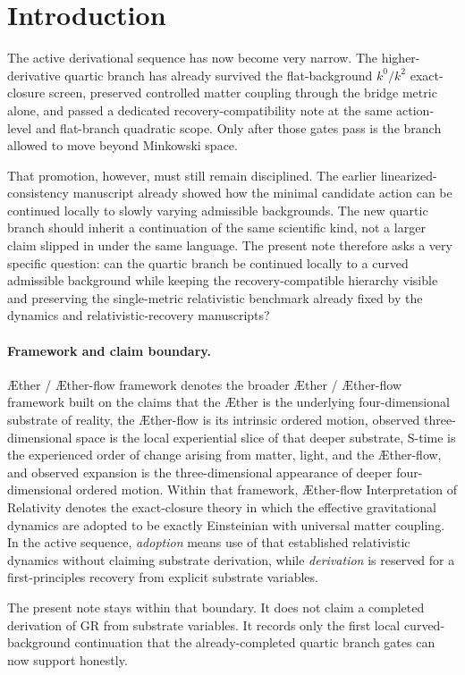 \documentclass[11pt]{article}
\newcommand{\Aether}{\AE{}ther}
\newcommand{\Aflow}{\AE{}ther-flow}
\newcommand{\TheoryName}{\Aflow{} Interpretation of Relativity}
\newcommand{\TheoryProgram}{\Aether{} / \Aflow{} framework}
\begin{document}
\section{Introduction}

The active derivational sequence has now become very narrow. The higher-derivative quartic branch has already survived the flat-background \(k^0/k^2\) exact-closure screen, preserved controlled matter coupling through the bridge metric alone, and passed a dedicated recovery-compatibility note at the same action-level and flat-branch quadratic scope. Only after those gates pass is the branch allowed to move beyond Minkowski space.

That promotion, however, must still remain disciplined. The earlier linearized-consistency manuscript already showed how the minimal candidate action can be continued locally to slowly varying admissible backgrounds. The new quartic branch should inherit a continuation of the same scientific kind, not a larger claim slipped in under the same language. The present note therefore asks a very specific question: can the quartic branch be continued locally to a curved admissible background while keeping the recovery-compatible hierarchy visible and preserving the single-metric relativistic benchmark already fixed by the dynamics and relativistic-recovery manuscripts?

\paragraph{Framework and claim boundary.}
\TheoryProgram{} denotes the broader \Aether{} / \Aflow{} framework built on the claims that the \Aether{} is the underlying four-dimensional substrate of reality, the \Aflow{} is its intrinsic ordered motion, observed three-dimensional space is the local experiential slice of that deeper substrate, S-time is the experienced order of change arising from matter, light, and the \Aflow{}, and observed expansion is the three-dimensional appearance of deeper four-dimensional ordered motion. Within that framework, \TheoryName{} denotes the exact-closure theory in which the effective gravitational dynamics are adopted to be exactly Einsteinian with universal matter coupling. In the active sequence, \emph{adoption} means use of that established relativistic dynamics without claiming substrate derivation, while \emph{derivation} is reserved for a first-principles recovery from explicit substrate variables.

The present note stays within that boundary. It does not claim a completed derivation of GR from substrate variables. It records only the first local curved-background continuation that the already-completed quartic branch gates can now support honestly.
\end{document}
